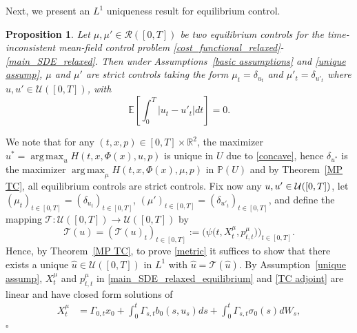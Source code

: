 \documentclass[12pt]{article}
\DeclareMathOperator*{\argmax}{arg\,max}
\newtheorem{prop}{Proposition}[section]
\theoremstyle{named}
\numberwithin{equation}{section}
\newenvironment{Proof}{\removelastskip\par\medskip \noindent{\em Proof.} \rm}{\penalty-20\null\hfill$\square$\par\medbreak}
\begin{document}
 Next, we present an $L^1$ uniqueness result
 for equilibrium control.
\begin{prop}
    \label{prop:uniqueness}
  Let $\mu, \mu' \in \mathcal{R}([0,T])$ be two
  equilibrium controls for the time-inconsistent mean-field control problem
  \eqref{cost_functional_relaxed}-\eqref{main_SDE_relaxed}.
  Then under Assumptions~\ref{basic assumptions} and \ref{unique assump},
  $\mu$ and $\mu' $ are strict controls taking the form
  $\mu_t = \delta_{u_t}$ and $\mu'_t = \delta_{u'_t}$
  where $u, u' \in \mathcal{U}([0,T])$,
  with
    \begin{equation}
      \label{metric}
      \mathbb{E}\left[ \int_0^T \left\lvert u_t - u'_t\right\rvert dt\right] = 0.
    \end{equation}
\end{prop}
\begin{Proof}
    We note that for any $(t,x,p) \in [0,T] \times\mathbb{R}^2$,
    the maximizer $u^* = \argmax_u H(t,x,\Phi( x ), u,p)$
    is unique in $U$ due to \eqref{concave},
    hence $\delta_{u^*}$ is the
    maximizer $\argmax_\mu H(t, x, \Phi(x), \mu, p)$ in $\mathbb{P}(U)$
    and by Theorem~\ref{MP TC}, all equilibrium controls are strict controls.
    Fix now any $u, u' \in {\cal U}([0,T])$,
     let $(\mu_t)_{t\in [0,T]} = (\delta_{u_t})_{t\in [0,T]}$,
    $(\mu' )_{t\in [0,T]}= (\delta_{u'_t} )_{t\in [0,T]}$, and
    define the mapping $\mathcal{T}:\mathcal{U}([0,T])\rightarrow\mathcal{U}([0,T])$ by
    \begin{equation*}
        \mathcal{T}(u) = (\mathcal{T}(u)_t)_{t\in [0,T]} := \big( \psi \big(t, X^\mu_t, p^{\mu}_{t,t}\big)\big)_{t \in [0,T]}.
\end{equation*}
Hence, by Theorem~\ref{MP TC},
to prove \eqref{metric}
it suffices to show that
there exists a unique $\hat{u}\in \mathcal{U}([0,T])$
in $L^1$ with $\hat{u} = \mathcal{T}(\hat{u})$.
By Assumption~\ref{unique assump},
$X^\mu_t$ and $p^{\mu}_{t,t}$
in \eqref{main_SDE_relaxed_equilibrium}
and \eqref{TC adjoint}
are linear and have closed form solutions of
\begin{align*}
    X^\mu_t & = \Gamma_{0,t}x_0 + \int_0^t \Gamma_{s,t} b_0(s,u_s) ds + \int_0^t \Gamma_{s,t}\sigma_0(s) dW_s, \\

\end{align*}
\end{Proof}
\end{document}
